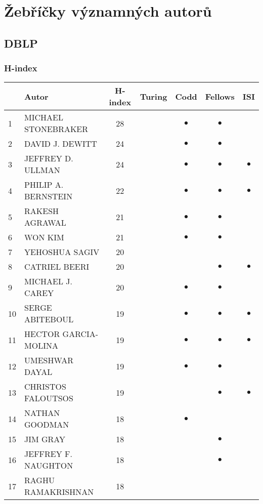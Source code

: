 \documentclass[12pt,titlepage]{report}
\begin{document}
\section{Žebříčky významných autorů}
\subsection{DBLP}
\subsubsection{H-index}
\begin{center}
\begin{tabular}{|l|l|c|c|c|c|c|}
\hline
& {\bf Autor} & {\bf H-index} & {\bf Turing} & {\bf Codd} & {\bf Fellows} & {\bf ISI} \\
\hline
1 & MICHAEL STONEBRAKER & 28& & $\bullet$ & $\bullet$ &         \\
\hline
2 & DAVID J. DEWITT & 24& & $\bullet$ & $\bullet$ &         \\
\hline
3 & JEFFREY D. ULLMAN & 24& & $\bullet$ & $\bullet$ & $\bullet$ \\
\hline
4 & PHILIP A. BERNSTEIN & 22& & $\bullet$ & $\bullet$ & $\bullet$ \\
\hline
5 & RAKESH AGRAWAL & 21& & $\bullet$ & $\bullet$ &         \\
\hline
6 & WON KIM & 21& & $\bullet$ & $\bullet$ &         \\
\hline
7 & YEHOSHUA SAGIV & 20& &         &         &         \\
\hline
8 & CATRIEL BEERI & 20& &         & $\bullet$ & $\bullet$ \\
\hline
9 & MICHAEL J. CAREY & 20& & $\bullet$ & $\bullet$ &         \\
\hline
10 & SERGE ABITEBOUL & 19& & $\bullet$ & $\bullet$ & $\bullet$ \\
\hline
11 & HECTOR GARCIA-MOLINA & 19& & $\bullet$ & $\bullet$ & $\bullet$ \\
\hline
12 & UMESHWAR DAYAL & 19& & $\bullet$ & $\bullet$ &         \\
\hline
13 & CHRISTOS FALOUTSOS & 19& &         & $\bullet$ & $\bullet$ \\
\hline
14 & NATHAN GOODMAN & 18& & $\bullet$ &         &         \\
\hline
15 & JIM GRAY & 18& &         & $\bullet$ &         \\
\hline
16 & JEFFREY F. NAUGHTON & 18& &         & $\bullet$ &         \\
\hline
17 & RAGHU RAMAKRISHNAN & 18& &         &         &         \\

\end{tabular}
\end{center}
\end{document}
